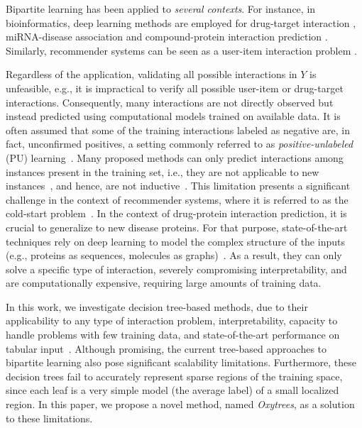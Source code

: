 \documentclass[letterpaper]{article}
\begin{document}
Bipartite learning has been applied to \emph{several contexts}.
For instance, in bioinformatics, deep learning methods are employed for drug-target interaction \cite{huang_moltrans_2020,lin2023comprehensive, bagherian2021machine,liu2024ssldti}, miRNA-disease association \cite{tian2024mgcnss} and compound-protein interaction prediction \cite{tsubaki2019compound}.
Similarly, recommender systems can be seen as a user-item interaction problem \cite{aggarwal2016recommender}.

Regardless of the application, validating all possible interactions in $Y$ is unfeasible, e.g., it is impractical to verify all possible user-item or drug-target interactions. Consequently, many interactions are not directly observed but instead predicted using computational models trained on available data. It is often assumed that some of the training interactions labeled as negative are, in fact, unconfirmed positives, a setting commonly referred to as \emph{positive-unlabeled} (PU) learning~\cite{bekker2020learning}.
Many proposed methods can only predict interactions among instances present in the training set, i.e., they are not applicable to new instances~\cite{park_flaws_2012,schrynemackers_protocols_2013,pahikkala_toward_2015}, and hence, are not inductive~\cite{chapelle_semi-supervised_2006}. This limitation presents a significant challenge in the context of recommender systems, where it is referred to as the cold-start problem~\cite{gharahighehi_addressing_2022}. In the context of drug-protein interaction prediction, it is crucial to generalize to new disease proteins.
For that purpose, state-of-the-art techniques rely on deep learning to model the complex structure of the inputs (e.g., proteins as sequences, molecules as graphs)~\cite{huang_moltrans_2020,dehghan_tripletmultidti_2023}. As a result, they can only solve a specific type of interaction, severely compromising interpretability, and are computationally expensive, requiring large amounts of training data.

In this work, we investigate decision tree-based methods, due to their applicability to any type of interaction problem,
interpretability, capacity to handle problems with few training data, and state-of-the-art performance on tabular input~\cite{grinsztajn_why_2022,costa2023recent,blockeel2023decision}. Although promising, the current tree-based approaches to bipartite learning also pose significant scalability limitations. Furthermore, these decision trees fail to accurately represent sparse regions of the training space, since each leaf is a very simple model (the average label) of a small localized region.
In this paper, we propose a novel method, named \emph{Oxytrees}, as a solution to these limitations.
\end{document}

